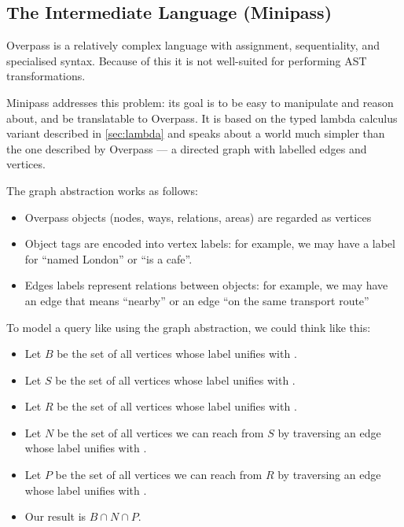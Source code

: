 \documentclass[main.tex]{subfiles}
\begin{document}
\subsection{The Intermediate Language (Minipass)}
\label{sec:minipass}
Overpass is a relatively complex language with assignment, sequentiality,
and specialised syntax. Because of this it is not well-suited for performing
AST transformations.

Minipass addresses this problem: its goal is to be easy to manipulate
and reason about, and be translatable to Overpass. It is based on the typed
lambda calculus variant described in \cref{sec:lambda} and speaks about a
world much simpler than the one described by Overpass --- a directed graph
with labelled edges and vertices.

The graph abstraction works as follows:
\begin{itemize}
    \item Overpass objects (nodes, ways, relations, areas) are regarded as
        vertices
    \item Object tags are encoded into vertex labels: for example, we
        may have a label for ``named London'' or ``is a cafe''.
    \item Edges labels represent relations between objects: for example,
        we may have an edge that means ``nearby'' or an edge ``on the same
        transport route''
\end{itemize}

\begin{example}
    To model a query like 
    using the graph abstraction, we could think like this:
    \begin{itemize}
        \item Let $B$ be the set of all vertices whose label unifies with
            .
        \item Let $S$ be the set of all vertices whose label unifies with
            .
        \item Let $R$ be the set of all vertices whose label unifies with
            .
        \item Let $N$ be the set of all vertices we can reach from $S$
            by traversing an edge whose label unifies with .
        \item Let $P$ be the set of all vertices we can reach from $R$
            by traversing an edge whose label unifies with .
        \item Our result is $B \cap N \cap P$.
    \end{itemize}
\end{example}
\end{document}
